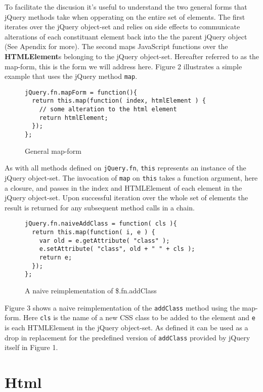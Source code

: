 \documentclass[preprint]{sigplanconf}
\begin{document}
To facilitate the discusion it's useful to understand the two general forms that jQuery methods take when opperating on the entire set of elements. The first iterates over the jQuery object-set and relies on side effects to communicate alterations of each constituant element back into the the parent jQuery object (See Apendix for more). The second maps JavaScript functions over the \textbf{HTMLElement}s belonging to the jQuery object-set. Hereafter referred to as the map-form, this is the form we will address here. Figure 2 illustrates a simple example that uses the jQuery method \verb|map|.

\begin{figure}[h!]
\begin{verbatim}
jQuery.fn.mapForm = function(){
  return this.map(function( index, htmlElement ) {
    // some alteration to the html element
    return htmlElement;
  });
};
\end{verbatim}
\nocaptionrule \caption{General map-form}
\end{figure}

\clearpage
As with all methods defined on \verb|jQuery.fn|, \verb|this| represents an instance of the jQuery object-set. The invocation of \verb|map| on \verb|this| takes a function argument, here a closure, and passes in the index and HTMLElement of each element in the jQuery object-set. Upon successful iteration over the whole set of elements the result is returned for any subsequent method calls in a chain.

\begin{figure}[h!]
\begin{verbatim}
jQuery.fn.naiveAddClass = function( cls ){
  return this.map(function( i, e ) {
    var old = e.getAttribute( "class" );
    e.setAttribute( "class", old + " " + cls );
    return e;
  });
};
\end{verbatim}
\nocaptionrule \caption{A naive reimplementation of \$.fn.addClass}
\end{figure}

Figure 3 shows a naive reimplementation of the \verb|addClass| method using the map-form. Here \verb|cls| is the name of a new CSS class to be added to the element and \verb|e| is each HTMLElement in the jQuery object-set. As defined it can be used as a drop in replacement for the predefined version of \verb|addClass| provided by jQuery itself in Figure 1.

\section{Html}
\end{document}
